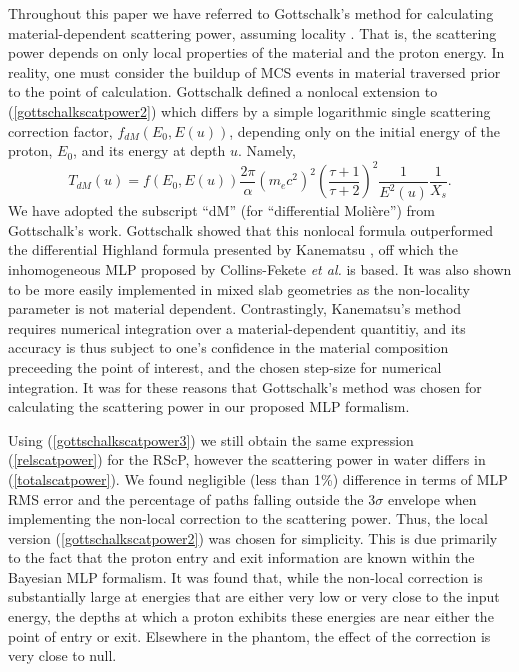 \documentclass[preprint,times]{elsarticle}
\newcommand{\Eqn}[1]{(#1)} %
\begin{document}
Throughout this paper we have referred to Gottschalk's method for calculating material-dependent scattering power, assuming locality \citep{gottschalkRadioProtons}. That is, the scattering power depends on only local properties of the material and the proton energy. In reality, one must consider the buildup of MCS events in material traversed prior to the point of calculation. Gottschalk defined a nonlocal extension to \Eqn{\ref{gottschalkscatpower2}} which differs by a simple logarithmic single scattering correction factor, $f_{dM}(E_0,E(u))$, depending only on the initial energy of the proton, $E_0$, and its energy at depth $u$. Namely,
\begin{equation}
T_{dM}(u) = f\left(E_0,E(u)\right)\frac{2\pi}{\alpha}\left( m_ec^2 \right)^2\left( \frac{\tau+1}{\tau+2} \right)^2\frac{1}{E^2(u)}\frac{1}{X_s}. \label{gottschalkscatpower3}
\end{equation}
We have adopted the subscript ``dM'' (for ``differential Moli\`ere'') from Gottschalk's work. Gottschalk showed that this nonlocal formula outperformed the differential Highland formula presented by Kanematsu \citep{Kanematsu2008}, off which the inhomogeneous MLP proposed by Collins-Fekete \emph{et al.} \citep{Collins2017} is based. It was also shown to be more easily implemented in mixed slab geometries as the non-locality parameter is not material dependent. Contrastingly, Kanematsu's method requires numerical integration over a material-dependent quantitiy, and its accuracy is thus subject to one's confidence in the material composition preceeding the point of interest, and the chosen step-size for numerical integration. It was for these reasons that Gottschalk's method was chosen for calculating the scattering power in our proposed MLP formalism. 

Using \Eqn{\ref{gottschalkscatpower3}} we still obtain the same expression \Eqn{\ref{relscatpower}} for the RScP, however the scattering power in water differs in \Eqn{\ref{totalscatpower}}. We found negligible (less than 1\%) difference in terms of MLP RMS error and the percentage of paths falling outside the 3$\sigma$ envelope when implementing the non-local correction to the scattering power. Thus, the local version \Eqn{\ref{gottschalkscatpower2}} was chosen for simplicity. This is due primarily to the fact that the proton entry and exit information are known within the Bayesian MLP formalism. It was found that, while the non-local correction is substantially large at energies that are either very low or very close to the input energy, the depths at which a proton exhibits these energies are near either the point of entry or exit. Elsewhere in the phantom, the effect of the correction is very close to null.
\end{document}
